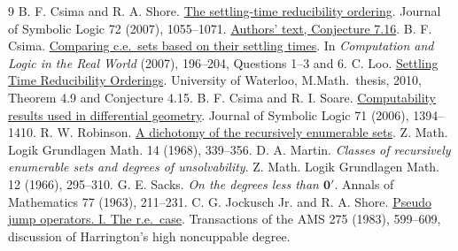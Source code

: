 \documentclass[11pt]{article}
\begin{document}
\begin{thebibliography}{9}
 B. F. Csima and R. A. Shore. \href{https://doi.org/10.2178/jsl/1191333856}{The settling-time reducibility ordering}. Journal of Symbolic Logic 72 (2007), 1055--1071. \href{https://www.math.uwaterloo.ca/~csima/papers/settlingtime.pdf}{Authors' text, Conjecture 7.16}.
 B. F. Csima. \href{https://doi.org/10.1007/978-3-540-73001-9_21}{Comparing c.e.\ sets based on their settling times}. In \emph{Computation and Logic in the Real World} (2007), 196--204, Questions 1--3 and 6.
 C. Loo. \href{https://dspacemainprd01.lib.uwaterloo.ca/server/api/core/bitstreams/796cde70-67e3-4073-a406-5d93d5c0140a/content}{Settling Time Reducibility Orderings}. University of Waterloo, M.Math.\ thesis, 2010, Theorem 4.9 and Conjecture 4.15.
 B. F. Csima and R. I. Soare. \href{https://doi.org/10.2178/jsl/1164060462}{Computability results used in differential geometry}. Journal of Symbolic Logic 71 (2006), 1394--1410.
 R. W. Robinson. \href{https://doi.org/10.1002/malq.19680142105}{A dichotomy of the recursively enumerable sets}. Z. Math. Logik Grundlagen Math. 14 (1968), 339--356.
 D. A. Martin. \emph{Classes of recursively enumerable sets and degrees of unsolvability}. Z. Math. Logik Grundlagen Math. 12 (1966), 295--310.
 G. E. Sacks. \emph{On the degrees less than $\mathbf 0'$}. Annals of Mathematics 77 (1963), 211--231.
 C. G. Jockusch Jr. and R. A. Shore. \href{https://doi.org/10.1090/S0002-9947-1983-0682720-1}{Pseudo jump operators. I. The r.e.\ case}. Transactions of the AMS 275 (1983), 599--609, discussion of Harrington's high noncuppable degree.
\end{thebibliography}
\end{document}
